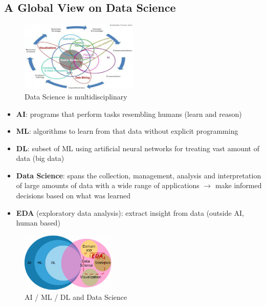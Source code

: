 \documentclass[a4paper]{article}
\begin{document}
		\subsection{A Global View on Data Science}
		
		\begin{figure}[htb!]
			\centering
			\includegraphics[width=0.5\textwidth]{img/sw01/multidisc.png}
			\caption{Data Science is multidisciplinary}
		\end{figure}
	
		\newpage
		
		\begin{itemize}
			\item \textbf{AI}: programs that perform tasks resembling humans (learn and reason)
			\item \textbf{ML}: algorithms to learn from that data without explicit programming
			\item \textbf{DL}: subset of ML using artificial neural networks for treating vast amount of data (big data)
			\item \textbf{Data Science}: spans the collection, management, analysis and interpretation of large amounts of data with a wide range of applications $\rightarrow$
				make informed decisions based on what was learned
			\item \textbf{EDA} (exploratory data analysis): extract insight from data (outside AI, human based)
		\end{itemize}
	
		\begin{figure}[htb!]
			\centering
			\includegraphics[width=0.4\textwidth]{img/sw01/global_view.png}
			\caption{AI / ML / DL and Data Science}
		\end{figure}
	
\end{document}
